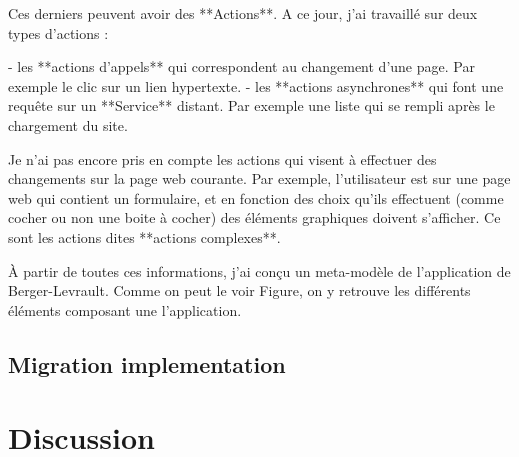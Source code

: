\documentclass[conference]{IEEEtran}
\begin{document}
Ces derniers peuvent avoir des **Actions**.
A ce jour, j'ai travaillé sur deux types d'actions :

- les **actions d'appels** qui correspondent au changement d'une page.
  Par exemple le clic sur un lien hypertexte.
- les **actions asynchrones** qui font une requête sur un **Service** distant.
  Par exemple une liste qui se rempli après le chargement du site.

Je n'ai pas encore pris en compte les actions qui visent à effectuer des changements sur la
  page web courante.
Par exemple, l'utilisateur est sur une page web qui contient un formulaire,
  et en fonction des choix qu'ils effectuent (comme cocher ou non une boite à cocher) des éléments graphiques
  doivent s'afficher.
Ce sont les actions dites **actions complexes**.

À partir de toutes ces informations, j'ai conçu un meta-modèle de l'application de Berger-Levrault.
Comme on peut le voir Figure, on y retrouve les différents éléments composant une l'application.
    
    \subsection{Migration implementation}
    \label{sec:implementation}
    
    
    
    \section{Discussion}
    \label{sec:discussion}
    
\end{document}
